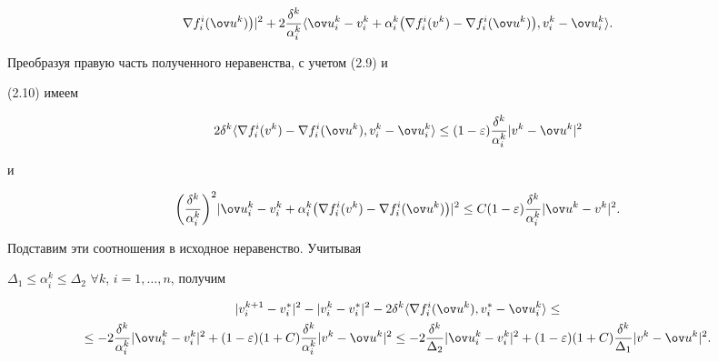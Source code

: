 \begin{pf}
\begin{multline*}
\nabla f^i_i(\ov u{}^k)\big)|^2+2\frac{\delta^k}{\alpha^k_i} 


\la\ov u{}^k_i-v^k_i+\alpha^k_i\big(\nabla f^i_i(v^k)- 


\nabla f^i_i(\ov u{}^k)\big), 


v^k_i-\ov u{}^k_i\ra. 


\end{multline*} 


Преобразуя правую часть полученного неравенства, с учетом (2.9) и 


(2.10) имеем 


$$ 


2\delta^k\la\nabla f^i_i(v^k)-\nabla f^i_i(\ov u{}^k), 


v^k_i-\ov u{}^k_i\ra\le(1-\varepsilon) 


\frac{\delta^k}{\alpha^k_i}|v^k-\ov u{}^k|^2 


$$ 


и 


$$ 


\bigg(\frac{\delta^k}{\alpha^k_i} \bigg)^2


|\ov u{}^k_i-v^k_i+\alpha^k_i\big(\nabla f^i_i(v^k)- 


\nabla f^i_i(\ov u{}^k)\big)|^2\le 


C(1-\varepsilon)\frac{\delta^k}{\alpha^k_i} 


|\ov u{}^k-v^k|^2. 


$$ 


Подставим эти соотношения в исходное неравенство. Учитывая 


$\Delta_1\le\alpha^k_i\le\Delta_2$ $\forall k$, $i=1,\dotsc,n$, получим 


\begin{multline*} 


|v^{k+1}_i-v^*_i|^2-|v^k_i-v^*_i|^2-2\delta^k\la\nabla 


f^i_i(\ov u{}^k),v^*_i-\ov u{}^k_i\ra\le \\ 


% 


\le -2\frac{\delta^k}{\alpha^k_i}|\ov u{}^k_i-v^k_i|^2+ 


(1-\varepsilon)(1+C)\frac{\delta^k}{\alpha^k_i}|v^k-\ov u{}^k|^2\le 


-2\frac{\delta^k}{\Delta_2}|\ov u{}^k_i-v^k_i|^2+ 


(1-\varepsilon)(1+C)\frac{\delta^k}{\Delta_1} 


|v^k-\ov u{}^k|^2. 


\end{multline*} 



\end{pf}

